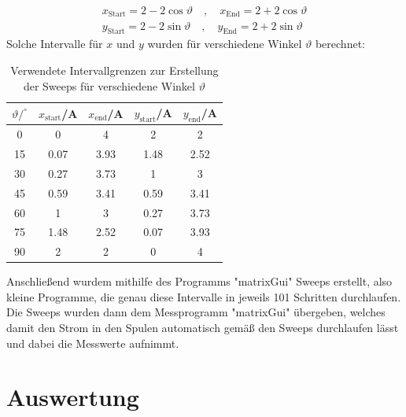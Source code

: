 \documentclass[german,  %
parskip=full,  %
]{scrartcl}
\begin{document}
\begin{align*}
x_{\mathrm{Start}} = 2 - 2\cos\vartheta \quad , \quad x_{\mathrm{End}} = 2 + 2\cos\vartheta \\
y_{\mathrm{Start}} = 2 - 2\sin\vartheta \quad , \quad y_{\mathrm{End}} = 2 + 2\sin\vartheta 
\end{align*}
Solche Intervalle für \(x\) und \(y\) wurden für verschiedene Winkel \(\vartheta\) berechnet:
\begin{table}[h!]
\centering
\begin{tabular}{|c|c|c|c|c|} \hline
$\vartheta / ^{\circ}$ & $x_{\text{start}}$/A & $x_{\text{end}}$/A & $y_{\text{start}}$/A & $y_{\text{end}}$/A \\\hline
0&0&4&2&2 \\\hline
15&0.07&3.93&1.48&2.52 \\\hline
30&0.27&3.73&1&3 \\\hline
45&0.59&3.41&0.59&3.41 \\\hline
60&1&3&0.27&3.73 \\\hline
75&1.48&2.52&0.07&3.93 \\\hline
90&2&2&0&4  \\\hline
\end{tabular}
\caption{Verwendete Intervallgrenzen zur Erstellung der Sweeps für verschiedene Winkel \(\vartheta\)}
\end{table}
Anschließend wurdem mithilfe des Programms "matrixGui" Sweeps erstellt, also kleine Programme, die genau diese Intervalle in jeweils 101 Schritten durchlaufen. Die Sweeps wurden dann dem Messprogramm "matrixGui" übergeben, welches damit den Strom in den Spulen automatisch gemäß den Sweeps durchlaufen lässt und dabei die Messwerte aufnimmt.
\section{Auswertung}
\end{document}
